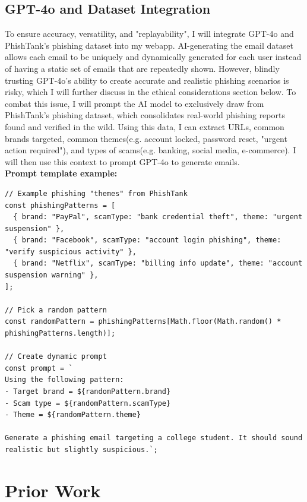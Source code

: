 \documentclass[10pt,twocolumn]{article}
\begin{document}
\subsection{GPT-4o and Dataset Integration}
To ensure accuracy, versatility, and "replayability", I will integrate GPT-4o and PhishTank's phishing dataset into my webapp. AI-generating the email dataset allows each email to be uniquely and dynamically generated for each user instead of having a static set of emails that are repeatedly shown. However, blindly trusting GPT-4o's ability to create accurate and realistic phishing scenarios is risky, which I will further discuss in the ethical considerations section below. To combat this issue, I will prompt the AI model to exclusively draw from PhishTank's phishing dataset, which consolidates real-world phishing reports found and verified in the wild. Using this data, I can extract URLs, common brands targeted, common themes(e.g. account locked, password reset, "urgent action required"), and types of scams(e.g. banking, social media, e-commerce). I will then use this context to prompt GPT-4o to generate emails. 
\\ \textbf{Prompt template example:}
\begin{verbatim}
// Example phishing "themes" from PhishTank
const phishingPatterns = [
  { brand: "PayPal", scamType: "bank credential theft", theme: "urgent suspension" },
  { brand: "Facebook", scamType: "account login phishing", theme: "verify suspicious activity" },
  { brand: "Netflix", scamType: "billing info update", theme: "account suspension warning" },
];

// Pick a random pattern
const randomPattern = phishingPatterns[Math.floor(Math.random() * phishingPatterns.length)];

// Create dynamic prompt
const prompt = `
Using the following pattern: 
- Target brand = ${randomPattern.brand}
- Scam type = ${randomPattern.scamType}
- Theme = ${randomPattern.theme}

Generate a phishing email targeting a college student. It should sound realistic but slightly suspicious.`;
\end{verbatim}

\section{Prior Work}
\end{document}
